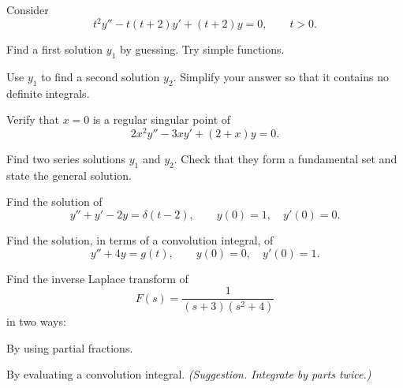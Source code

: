 \documentclass[11pt,oneside]{article}
\begin{document}
\begin{problem}
Consider
\[
t^2y''-t(t+2)y'+(t+2)y=0,\qquad t>0.
\]
\begin{problemsubparts}
\item Find a first solution $y_1$ by guessing. Try simple functions.
\item Use $y_1$ to find a second solution $y_2$. Simplify your answer so that it contains no definite integrals.
\end{problemsubparts}
\end{problem}

\begin{problem}
\begin{problemsubparts}
\item Verify that $x=0$ is a regular singular point of
\[
2x^2y''-3xy'+(2+x)y=0.
\]
\item Find two series solutions $y_1$ and $y_2$. Check that they form a fundamental set and state the general solution.
\end{problemsubparts}
\end{problem}

\begin{problem}
Find the solution of
\[
y''+y'-2y=\delta(t-2),\qquad y(0)=1,\quad y'(0)=0.
\]
\end{problem}

\begin{problem}
Find the solution, in terms of a convolution integral, of
\[
y''+4y=g(t),\qquad y(0)=0,\quad y'(0)=1.
\]
\end{problem}

\begin{problem}
Find the inverse Laplace transform of
\[
F(s)=\frac{1}{(s+3)(s^2+4)}
\]
in two ways:
\begin{problemsubparts}
\item By using partial fractions.
\item By evaluating a convolution integral. \textit{(Suggestion. Integrate by parts twice.)}
\end{problemsubparts}
\end{problem}
\end{document}
